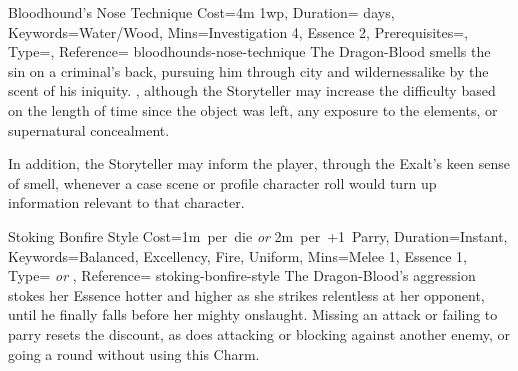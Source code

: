 \begin{Charm}{Bloodhound's Nose Technique}{%
    Cost=4m 1wp,
    Duration={ days},
    Keywords=Water/Wood,
    Mins={Investigation 4, Essence 2},
    Prerequisites=,
    Type=\SimpleType,
    Reference=\cite*[p.~199]{db}
}{bloodhounds-nose-technique}
    The Dragon-Blood smells the sin on a criminal's back, pursuing him through city
    and wildernessalike by the scent of his iniquity. , although the Storyteller may increase the difficulty based on
    the length of time since the object was left, any exposure to the elements, or
    supernatural concealment. 

     In addition, the Storyteller may inform the player,
    through the Exalt's keen sense of smell, whenever a case scene or profile
    character roll would turn up information relevant to that character.
\end{Charm}




\begin{Charm}{Stoking Bonfire Style}{%
    Cost={1m~per~die \emph{or} 2m~per~+1~Parry},
    Duration=Instant,
    Keywords={Balanced, Excellency, Fire, Uniform},
    Mins={Melee 1, Essence 1},
    Type={\SupplementalType{} \emph{or} \ReflexiveType},
    Reference=\cite*[p.~225]{db}
}{stoking-bonfire-style}
    The Dragon-Blood's aggression stokes her Essence hotter and higher as she
    strikes relentless at her opponent, until he finally falls before her mighty
    onslaught.  Missing an
    attack or failing to parry resets the discount, as does attacking or blocking
    against another enemy, or going a round without using this Charm.
\end{Charm}


